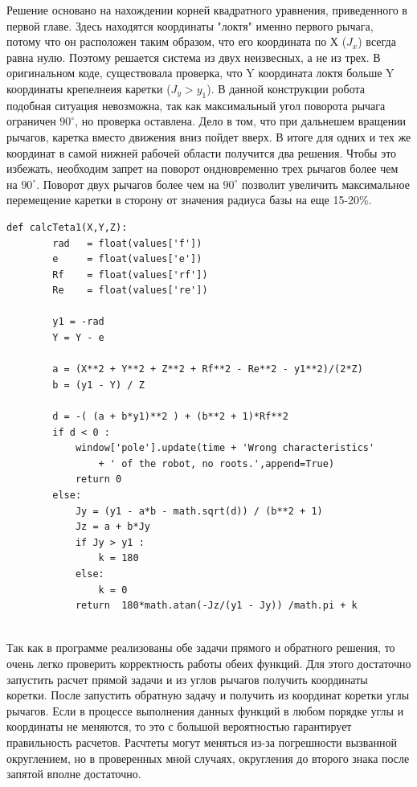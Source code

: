 Решение основано на нахождении корней квадратного уравнения, приведенного в первой главе. Здесь находятся координаты "локтя" именно первого рычага, потому что он расположен таким образом, что его координата по Х ($J_{x}$) всегда равна нулю. Поэтому решается система из двух неизвесных, а не из трех. В оригинальном коде, существовала проверка, что Y координата локтя больше Y координаты крепелнеия каретки ($J_{y} > y_{1}$). В данной конструкции робота подобная ситуация невозможна, так как максимальный угол поворота рычага ограничен $90^{\circ}$, но проверка оставлена. Дело в том, что при дальнешем вращении рычагов, каретка вместо движения вниз пойдет вверх. В итоге для одних и тех же координат в самой нижней рабочей области получится два решения. Чтобы это избежать, необходим запрет на поворот ондновременно трех рычагов более чем на $90^{\circ}$. Поворот двух рычагов более чем на $90^{\circ}$ позволит увеличить максимальное перемещение каретки в сторону от значения радиуса базы на еще 15-20\%.      

\begin{lstlisting}[style=python,caption=Вспомогательная функция обратной задачи]
    def calcTeta1(X,Y,Z):
        rad   = float(values['f'])
        e     = float(values['e'])
        Rf    = float(values['rf'])
        Re    = float(values['re'])

        y1 = -rad
        Y = Y - e

        a = (X**2 + Y**2 + Z**2 + Rf**2 - Re**2 - y1**2)/(2*Z)
        b = (y1 - Y) / Z

        d = -( (a + b*y1)**2 ) + (b**2 + 1)*Rf**2
        if d < 0 :
            window['pole'].update(time + 'Wrong characteristics'
                + ' of the robot, no roots.',append=True)
            return 0
        else:
            Jy = (y1 - a*b - math.sqrt(d)) / (b**2 + 1)
            Jz = a + b*Jy
            if Jy > y1 :
                k = 180
            else:
                k = 0
            return  180*math.atan(-Jz/(y1 - Jy)) /math.pi + k


\end{lstlisting}

Так как в программе реализованы обе задачи прямого и обратного решения, то очень легко проверить корректность работы обеих функций. Для этого достаточно запустить расчет прямой задачи и из углов рычагов получить координаты коретки. После запустить обратную задачу и получить из координат коретки углы рычагов. Если в процессе выполнения данных функций в любом порядке углы и координаты не меняются, то это с большой вероятностью гарантирует правильность расчетов. Расчтеты могут меняться из-за погрешности вызванной округлением, но в проверенных мной случаях, округления до второго знака после запятой вполне достаточно. 

